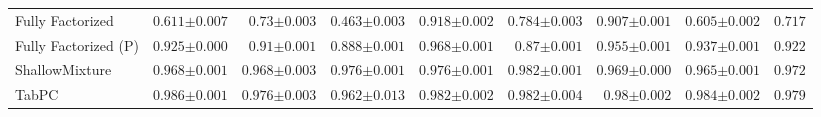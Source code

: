 \begin{tabular}{lrrrrrrr|r}
    \midrule
    Fully Factorized & $0.611${\tiny${\pm 0.007}$} & $0.73${\tiny${\pm 0.003}$} & $0.463${\tiny${\pm 0.003}$} & $0.918${\tiny${\pm 0.002}$} & $0.784${\tiny${\pm 0.003}$} & $0.907${\tiny${\pm 0.001}$} & $0.605${\tiny${\pm 0.002}$} & $0.717$ \\
    Fully Factorized (P) & $0.925${\tiny${\pm 0.000}$} & $0.91${\tiny${\pm 0.001}$} & $0.888${\tiny${\pm 0.001}$} & $0.968${\tiny${\pm 0.001}$} & $0.87${\tiny${\pm 0.001}$} & $0.955${\tiny${\pm 0.001}$} & $0.937${\tiny${\pm 0.001}$} & $0.922$ \\
    ShallowMixture & $0.968${\tiny${\pm 0.001}$} & $0.968${\tiny${\pm 0.003}$} & $0.976${\tiny${\pm 0.001}$} & $0.976${\tiny${\pm 0.001}$} & $0.982${\tiny${\pm 0.001}$} & $0.969${\tiny${\pm 0.000}$} & $0.965${\tiny${\pm 0.001}$} & $0.972$ \\
    TabPC & $0.986${\tiny${\pm 0.001}$} & $0.976${\tiny${\pm 0.003}$} & $0.962${\tiny${\pm 0.013}$} & $0.982${\tiny${\pm 0.002}$} & $0.982${\tiny${\pm 0.004}$} & $0.98${\tiny${\pm 0.002}$} & $0.984${\tiny${\pm 0.002}$} & $0.979$ \\
    \bottomrule[1.0pt]
\end{tabular}